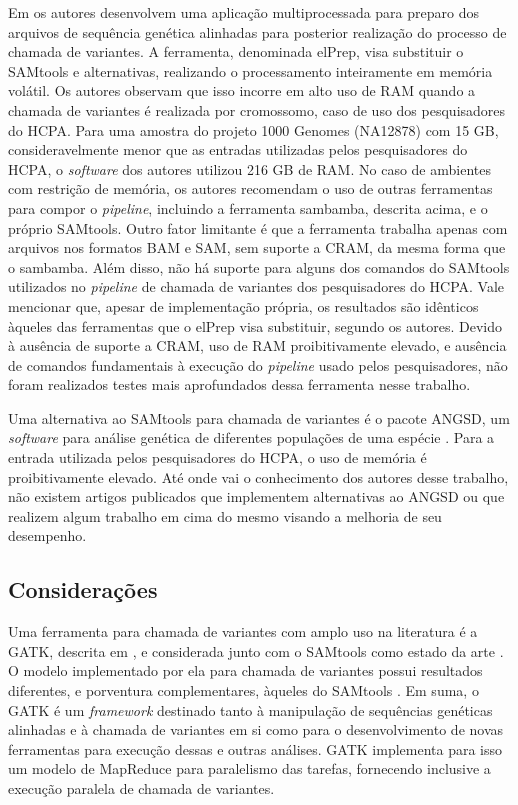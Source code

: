 \documentclass[cic,tc]{iiufrgs}
\begin{document}
Em \cite{herzeel2015elprep} os autores desenvolvem uma aplicação
multiprocessada para preparo dos arquivos de sequência genética alinhadas para
posterior realização do processo de chamada de variantes. A ferramenta,
denominada elPrep, visa substituir o SAMtools e alternativas, realizando o
processamento inteiramente em memória volátil. Os autores observam que isso
incorre em alto uso de RAM quando a chamada de variantes é realizada por
cromossomo, caso de uso dos pesquisadores do HCPA. Para uma amostra do projeto
1000 Genomes (NA12878) com 15 GB, consideravelmente menor que as entradas
utilizadas pelos pesquisadores do HCPA, o \textit{software} dos autores utilizou 216 GB
de RAM. No caso de ambientes com restrição de memória, os autores recomendam o
uso de outras ferramentas para compor o \textit{pipeline}, incluindo a ferramenta
sambamba, descrita acima, e o próprio SAMtools. Outro fator limitante é que a
ferramenta trabalha apenas com arquivos nos formatos BAM e SAM, sem suporte a
CRAM, da mesma forma que o sambamba. Além disso, não há suporte para alguns dos
comandos do SAMtools utilizados no \textit{pipeline} de chamada de variantes dos
pesquisadores do HCPA. Vale mencionar que, apesar de implementação própria, os
resultados são idênticos àqueles das ferramentas que o elPrep visa substituir,
segundo os autores. Devido à ausência de suporte a CRAM, uso de RAM
proibitivamente elevado, e ausência de comandos fundamentais à execução do
\textit{pipeline} usado pelos pesquisadores, não foram realizados testes mais
aprofundados dessa ferramenta nesse trabalho.

Uma alternativa ao SAMtools para chamada de variantes é o pacote ANGSD, um
\textit{software} para análise genética de diferentes populações de uma espécie
\cite{korneliussen2014angsd}. Para a entrada utilizada pelos pesquisadores do
HCPA, o uso de memória é proibitivamente elevado. Até onde vai o conhecimento
dos autores desse trabalho, não existem artigos publicados que implementem
alternativas ao ANGSD ou que realizem algum trabalho em cima do mesmo visando a
melhoria de seu desempenho.

\subsection{Considerações}
\label{sec:alt}

Uma ferramenta para chamada de variantes com amplo uso na literatura
\cite{de2017gatk} é a GATK, descrita em \cite{mckenna2010genome}, e considerada
junto com o SAMtools como estado da
arte \cite{yao2020evaluation} \cite{poplin2018universal}. O modelo implementado
por ela para chamada de variantes possui resultados diferentes, e porventura
complementares, àqueles do
SAMtools \cite{gezsi2015variantmetacaller} \cite{hwang2015systematic}. Em suma, o
GATK é um \textit{framework} destinado tanto à manipulação de sequências genéticas
alinhadas e à chamada de variantes em si como para o desenvolvimento de novas
ferramentas para execução dessas e outras análises. GATK implementa para isso
um modelo de MapReduce para paralelismo das tarefas, fornecendo inclusive a
execução paralela de chamada de variantes.
\end{document}
